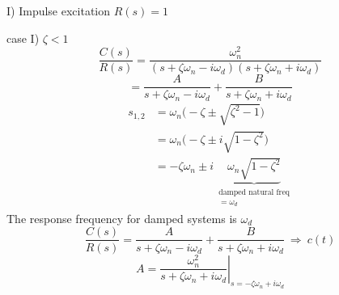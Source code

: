 \documentclass[11pt,a4paper]{article}
\begin{document}
I) Impulse excitation \qquad $R(s)=1$

case I) $\zeta<1$
\[ \frac{C(s)}{R(s)}=\frac{\omega_n^2}{(s+\zeta\omega_n-i\omega_d)(s+\zeta\omega_n+i\omega_d)} \]
\[ =\frac{A}{s+\zeta\omega_n-i\omega_d}+\frac{B}{s+\zeta\omega_n+i\omega_d} \]
\begin{align*}
s_{1,2}&=\omega_n\bigl(-\zeta\pm\sqrt{\zeta^2-1}\bigr)\\
&=\omega_n\bigl(-\zeta\pm i\sqrt{1-\zeta^2}\bigr)\\
&=-\zeta\omega_n\pm i\,\underbrace{\omega_n\sqrt{1-\zeta^2}}_{\substack{\text{damped natural freq}\\=\omega_d}}
\end{align*}
The response frequency for damped systems is $\omega_d$
\[ \frac{C(s)}{R(s)}=\frac{A}{s+\zeta\omega_n-i\omega_d}+\frac{B}{s+\zeta\omega_n+i\omega_d}\ \Rightarrow\ c(t) \]
\[ A=\left.\frac{\omega_n^2}{s+\zeta\omega_n+i\omega_d}\right|_{s=-\zeta\omega_n+i\omega_d} \]
\end{document}
